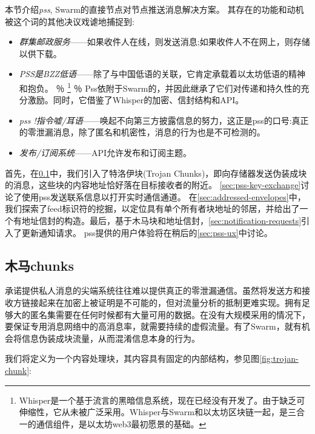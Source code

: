 \green{}

本节介绍\emph{pss}, Swarm的直接节点对节点推送消息解决方案。
其存在的功能和动机被这个词的其他决议戏谑地捕捉到:

\begin{itemize}
\item \emph{群集邮政服务}——如果收件人在线，则发送消息;如果收件人不在网上，则存储以供下载。
\item \emph{PSS是BZZ低语}——除了与中国低语的关联，它肯定承载着以太坊低语的精神和抱负。%
％
\footnote{Whisper是一个基于流言的黑暗信息系统，现在已经没有开发了。由于缺乏可伸缩性，它从未被广泛采用。Whisper与Swarm和以太坊区块链一起，是三合一的通信组件，是以太坊web3最初愿景的基础。}
％
Pss依附于Swarm的，并因此继承了它们对传递和持久性的充分激励。同时，它借鉴了Whisper的加密、信封结构和API。
\item \emph{pss !指令嘘/耳语}——唤起不向第三方披露信息的努力，这正是pss的口号:真正的零泄漏消息，除了匿名和机密性，消息的行为也是不可检测的。
\item  \emph{发布/订阅系统}——API允许发布和订阅主题。
\end{itemize}

首先，在\ref{sec:trojan}中，我们引入了特洛伊块(Trojan Chunks)，即向存储器发送伪装成块的消息，这些块的内容地址恰好落在目标接收者的附近。 
\ref{sec:pss-key-exchange}讨论了使用pss发送联系信息以打开实时通信通道。
在\ref{sec:addressed-envelopes}中，我们探索了feed标识符的挖掘，以定位具有单个所有者块地址的邻居，并给出了一个有地址信封的构造。最后，基于木马块和地址信封，\ref{sec:notification-requests}引入了更新通知请求。
pss提供的用户体验将在稍后的\ref{sec:pss-ux}中讨论。 

\subsection{木马chunks\statusgreen}\label{sec:trojan}

承诺提供私人消息的尖端系统往往难以提供真正的零泄漏通信\cite{kwon2016riffle}。虽然将发送方和接收方链接起来在加密上被证明是不可能的，但对流量分析的抵制更难实现。拥有足够大的匿名集需要在任何时候都有大量可用的数据。在没有大规模采用的情况下，要保证专用消息网络中的高消息率，就需要持续的虚假流量。有了Swarm，就有机会将信息伪装成块流量，从而混淆信息本身的行为。

我们将定义为一个内容处理块，其内容具有固定的内部结构，参见图\ref{fig:trojan-chunk}:

